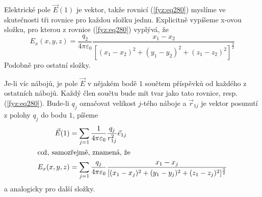     Elektrické pole \(\vec{E}(1)\) je vektor, takže rovnicí (\ref{fyz:eq280}) myslíme ve 
    skutečnosti tři rovnice pro  každou složku jednu. Explicitně vypíšeme x-ovou složku, pro kterou 
    z rovnice (\ref{fyz:eq280}) vyplývá, že
    \begin{equation*}             %
      E_x(x,y,z) = \frac{q_2}{4\pi\varepsilon_0}
                   \frac{x_1-x_2}{[(x_1-x_2)^2+(y_1-y_2)^2+(z_1-z_2)^2]^{\frac{3}{2}}}
    \end{equation*}
    Podobně pro ostatní složky.
     
    Je-li víc nábojů, je pole \(\vec{E}\) v nějakém bodě \(1\) součtem příspěvků od každého z 
    ostatních nábojů. Každý člen součtu bude mít tvar jako tato rovnice, resp. 
    (\ref{fyz:eq280}). Bude-li \(q_j\) označovat velikost \(j\)-tého náboje a  
    \(\vec{r}_{1j}\) je vektor posunutí z polohy 
    \(q_j\) do bodu \(1\), píšeme
    \begin{align}
      \vec{E}(1) &= \sum\limits_{j=1}\frac{1}{4\pi\varepsilon_0}\frac{q_j}{r^2_{1j}}\vec{e}_{1j}
                    \label{fyz:eq276}    \\
      \shortintertext{což, samozřejmě, znamená, že}
      E_x(x,y,z) &= \sum\limits_{j=1}\frac{q_j}{4\pi\varepsilon_0}
                    \frac{x_1-x_j}{[(x_1-x_j)^2+(y_1-y_j)^2+(z_1-z_j)^2]^{\frac{3}{2}}} 
                                         \nonumber  
    \end{align}     
    a analogicky pro další složky.
    
